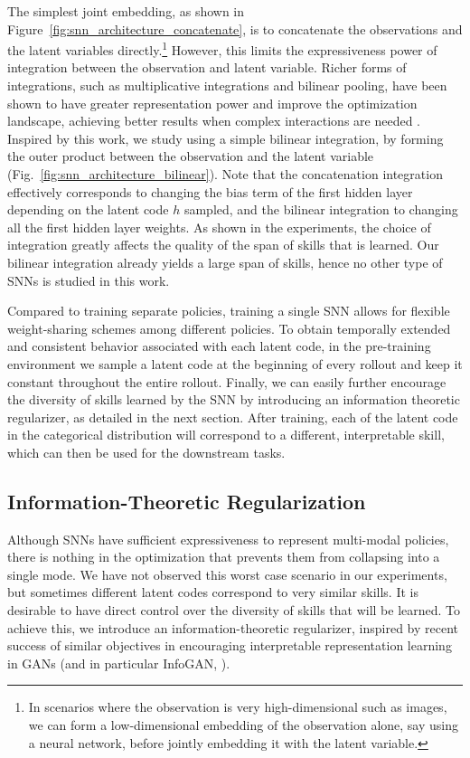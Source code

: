 \documentclass{article} %
\begin{document}
The simplest joint embedding, as shown in Figure~\ref{fig:snn_architecture_concatenate}, is to concatenate the observations and the latent variables directly.\footnote{In scenarios where the observation is very high-dimensional such as images, we can form a low-dimensional embedding of the observation alone, say using a neural network, before jointly embedding it with the latent variable.} However, this limits the expressiveness power of integration between the observation and latent variable. Richer forms of integrations, such as multiplicative integrations and bilinear pooling, have been shown to have greater representation power and improve the optimization landscape, achieving better results when complex interactions are needed \citep{fukui2016multimodal, wu2016multiplicative}. Inspired by this work, we study using a simple bilinear integration, by forming the outer product between the observation and the latent variable (Fig.~\ref{fig:snn_architecture_bilinear}). Note that the concatenation integration effectively corresponds to changing the bias term of the first hidden layer depending on the latent code $h$ sampled, and the bilinear integration to changing all the first hidden layer weights. As shown in the experiments, the choice of integration greatly affects the quality of the span of skills that is learned. Our bilinear integration already yields a large span of skills, hence no other type of SNNs is studied in this work.


Compared to training separate policies, training a single SNN allows for flexible weight-sharing schemes among different policies. 
To obtain temporally extended and consistent behavior associated with each latent code, in the pre-training environment we sample a latent code at the beginning of every rollout and keep it constant throughout the entire rollout.
Finally, we can easily further encourage the diversity of skills learned by the SNN by introducing an information theoretic regularizer, as detailed in the next section. 
After training, each of the latent code in the categorical distribution will correspond to a different, interpretable skill, which can then be used for the downstream tasks.


\subsection{Information-Theoretic Regularization}
\label{section:method:inforeg}

Although SNNs have sufficient expressiveness to represent multi-modal policies, there is nothing in the optimization that prevents them from collapsing into a single mode. We have not observed this worst case scenario in our experiments, but sometimes different latent codes correspond to very similar skills. It is desirable to have direct control over the diversity of skills that will be learned. To achieve this, we introduce an information-theoretic regularizer, inspired by recent success of similar objectives in encouraging interpretable representation learning in GANs (and in particular InfoGAN, \citet{chen2016infogan}).
\end{document}
